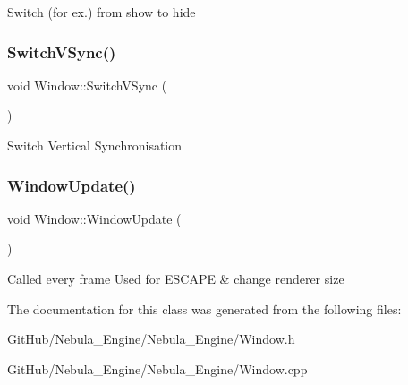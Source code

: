 Switch (for ex.) from show to hide \mbox{\label{class_window_a50875755f703cf58788146c80e5f752c}} 
\subsubsection{\texorpdfstring{SwitchVSync()}{SwitchVSync()}}
{\footnotesize\ttfamily void Window\+::\+Switch\+V\+Sync (\begin{DoxyParamCaption}{ }\end{DoxyParamCaption})}

Switch Vertical Synchronisation \mbox{\label{class_window_abbe71691ebdc8d45fff39f53f0b077a7}} 
\subsubsection{\texorpdfstring{WindowUpdate()}{WindowUpdate()}}
{\footnotesize\ttfamily void Window\+::\+Window\+Update (\begin{DoxyParamCaption}{ }\end{DoxyParamCaption})}

Called every frame Used for E\+S\+C\+A\+PE \& change renderer size 

The documentation for this class was generated from the following files\+:\begin{DoxyCompactItemize}
\item 
Git\+Hub/\+Nebula\+\_\+\+Engine/\+Nebula\+\_\+\+Engine/Window.\+h\item 
Git\+Hub/\+Nebula\+\_\+\+Engine/\+Nebula\+\_\+\+Engine/Window.\+cpp\end{DoxyCompactItemize}
